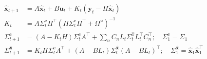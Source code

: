 $$
\begin{aligned}
\hat{\mathbf{x}}_{t+1} &=A \hat{\mathbf{x}}_{t}+B \mathbf{u}_{t}+K_{t}\left(\mathbf{y}_{t}-H \hat{\mathbf{x}}_{t}\right) \\
K_{t} &=A \Sigma_{t}^{\mathrm{e}} H^\top\left(H \Sigma_{t}^{\mathrm{e}} H^\top+\Omega^{\omega}\right)^{-1} \\
\Sigma_{t+1}^{\mathrm{e}} &=\left(A-K_{t} H\right) \Sigma_{t}^{\mathrm{e}} A^\top+\sum_{n} C_{n} L_{t} \Sigma_{t}^{\hat{x}} L_{t}^\top C_{n}^\top ; \quad \Sigma_{1}^{\mathrm{e}}=\Sigma_{1} \\
\Sigma_{t+1}^{\hat{\mathbf{x}}} &=K_{t} H \Sigma_{t}^{\mathrm{e}} A^\top+\left(A-B L_{t}\right) \Sigma_{t}^{\hat{\mathbf{x}}}\left(A-B L_{t}\right)^\top ; \quad \Sigma_{1}^{\hat{\mathbf{x}}}=\hat{\mathbf{x}}_{1} \hat{\mathbf{x}}_{1}^\top
\end{aligned}
$$
